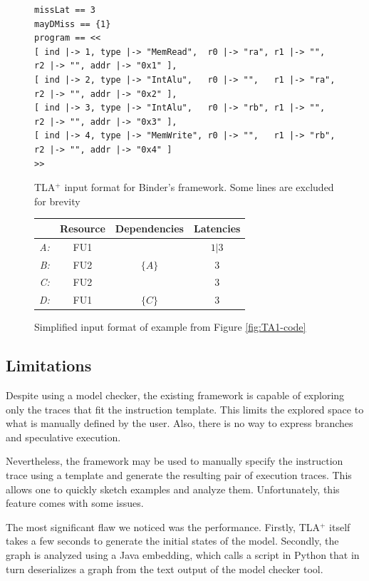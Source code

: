 \begin{figure}[H]
\begin{lstlisting}[basicstyle=\fontsize{8}{13}\selectfont\ttfamily]
missLat == 3
mayDMiss == {1}
program == <<
[ ind |-> 1, type |-> "MemRead",  r0 |-> "ra", r1 |-> "",   r2 |-> "", addr |-> "0x1" ],
[ ind |-> 2, type |-> "IntAlu",   r0 |-> "",   r1 |-> "ra", r2 |-> "", addr |-> "0x2" ],
[ ind |-> 3, type |-> "IntAlu",   r0 |-> "rb", r1 |-> "",   r2 |-> "", addr |-> "0x3" ],
[ ind |-> 4, type |-> "MemWrite", r0 |-> "",   r1 |-> "rb", r2 |-> "", addr |-> "0x4" ]
>>
\end{lstlisting}
\caption{TLA$^+$ input format for Binder's framework. Some lines are excluded for brevity}
\label{fig:TLA-format}
\end{figure}


\begin{figure}[htbp]
	\centering
	\begin{tabular}{r|ccc}
    & Resource & Dependencies & Latencies \\ \hline
    \textit{A:} & FU1 &  & $1 | 3$ \\
    \textit{B:} & FU2 & $\{A\}$ & $3$ \\
    \textit{C:} & FU2 &  & $3$ \\
    \textit{D:} & FU1 & $\{C\}$ & $3$ \\
    \end{tabular}

	\caption{Simplified input format of example from Figure \ref{fig:TA1-code}}
	\label{fig:input-format}
\end{figure}

\subsection{Limitations}

Despite using a model checker, the existing framework is capable of exploring only the traces that fit the instruction template. This limits the explored space to what is manually defined by the user. Also, there is no way to express branches and speculative execution.

Nevertheless, the framework may be used to manually specify the instruction trace using a template and generate the resulting pair of execution traces. This allows one to quickly sketch examples and analyze them. Unfortunately, this feature comes with some issues.

The most significant flaw we noticed was the performance. Firstly, TLA$^+$ itself takes a few seconds to generate the initial states of the model. Secondly, the graph is analyzed using a Java embedding, which calls a script in Python that in turn deserializes a graph from the text output of the model checker tool.


